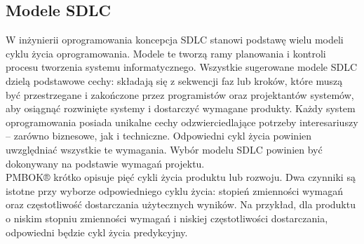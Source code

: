 \subsection{Modele SDLC}
W inżynierii oprogramowania koncepcja SDLC stanowi podstawę wielu modeli cyklu życia oprogramowania. Modele te tworzą ramy planowania i kontroli procesu tworzenia systemu informatycznego.\autocite{swebok}  Wszystkie sugerowane modele SDLC dzielą podstawowe cechy: składają się z sekwencji faz lub kroków, które muszą być przestrzegane i zakończone przez programistów oraz projektantów systemów, aby osiągnąć rozwinięte systemy i dostarczyć wymagane produkty. \autocite{alshamrani2015comparison}  Każdy system oprogramowania posiada unikalne cechy odzwierciedlające potrzeby interesariuszy – zarówno biznesowe, jak i techniczne. Odpowiedni cykl życia powinien uwzględniać wszystkie te wymagania.\autocite{swebok} Wybór modelu SDLC powinien być dokonywany na podstawie wymagań projektu. \autocite{arora2016analysis}
\\
PMBOK® krótko opisuje pięć cykli życia produktu lub rozwoju. Dwa czynniki są istotne przy wyborze odpowiedniego cyklu życia: stopień zmienności wymagań oraz częstotliwość dostarczania użytecznych wyników. Na przykład, dla produktu o niskim stopniu zmienności wymagań i niskiej częstotliwości dostarczania, odpowiedni będzie cykl życia predykcyjny. \autocite{pmbok6}\autocite{ITPM}

